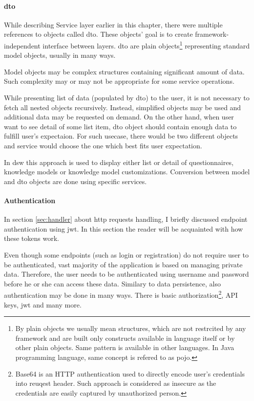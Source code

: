 \paragraph*{\gls{dto}} While describing Service layer earlier in this chapter, there were multiple references to objects called \gls{dto}.
These objects' goal is to create framework-independent interface between layers.
\gls{dto} are plain objects\footnote{By plain objects we usually mean structures, which are not restrcited by any framework and are built only constructs available in language itself or by other plain objects. Same pattern is available in other languages. In Java programming language, same concept is refered to as \gls{pojo}\cite{wiki-pojo}.} representing standard model objects, usually in many ways.

Model objects may be complex structures containing significant amount of data.
Such complexity may or may not be appropriate for some service operations.

While presenting list of data (populated by \gls{dto}) to the user, it is not necessary to fetch all nested objects recursively.
Instead, simplified objects may be used and additional data may be requested on demand.
On the other hand, when user want to see detail of some list item, \gls{dto} object should contain enough data to fulfill user's expectaion.
For such usecase, there would be two different objects and service would choose the one which best fits user expectation.


In \gls{dsw} this approach is used to display either list or detail of questionnaires, knowledge models or knowledge model customizations.
Conversion between model and \gls{dto} objects are done using specific services.

\paragraph*{Authentication} In section \ref{sec:handler} about \gls{http} requests handling, I briefly discussed endpoint authentication using \gls{jwt}.
In this section the reader will be acquainted with how these tokens work.

Even though some endpoints (such as login or registration) do not require user to be authenticated, vast majority of the application is based on managing private data.
Therefore, the user needs to be authenticated using username and password before he or she can access these data.
Similary to data persistence, also authentication may be done in many ways.
There is basic authorization\footnote{Base64 is an HTTP authentication used to directly encode user's credentials into reuqest header. Such approach is considered as insecure as the credentials are easily captured by unauthorized person\cite{qnimate-base64}.}, API keys, \gls{jwt} and many more.


